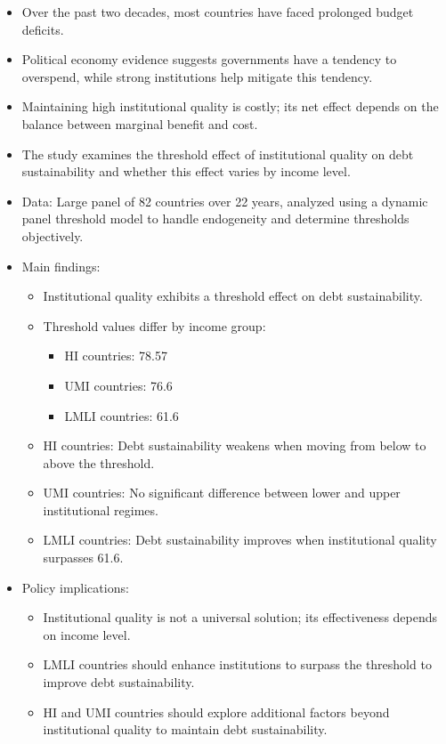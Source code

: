 \documentclass[10pt, oneside]{article}
\begin{document}
\begin{itemize}
	\item Over the past two decades, most countries have faced prolonged budget deficits.
	\item Political economy evidence suggests governments have a tendency to overspend, while strong institutions help mitigate this tendency.
	\item Maintaining high institutional quality is costly; its net effect depends on the balance between marginal benefit and cost.
	\item The study examines the threshold effect of institutional quality on debt sustainability and whether this effect varies by income level.
	\item Data: Large panel of 82 countries over 22 years, analyzed using a dynamic panel threshold model to handle endogeneity and determine thresholds objectively.
	\item Main findings:
	      \begin{itemize}
		      \item Institutional quality exhibits a threshold effect on debt sustainability.
		      \item Threshold values differ by income group:
		            \begin{itemize}
			            \item HI countries: 78.57
			            \item UMI countries: 76.6
			            \item LMLI countries: 61.6
		            \end{itemize}
		      \item HI countries: Debt sustainability weakens when moving from below to above the threshold.
		      \item UMI countries: No significant difference between lower and upper institutional regimes.
		      \item LMLI countries: Debt sustainability improves when institutional quality surpasses 61.6.
	      \end{itemize}
	\item Policy implications:
	      \begin{itemize}
		      \item Institutional quality is not a universal solution; its effectiveness depends on income level.
		      \item LMLI countries should enhance institutions to surpass the threshold to improve debt sustainability.
		      \item HI and UMI countries should explore additional factors beyond institutional quality to maintain debt sustainability.

\end{itemize}
\end{itemize}
\end{document}

